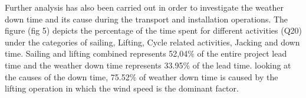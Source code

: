 Further analysis has also been carried out in order to investigate the weather down time and its cause during the transport and installation operations. The figure (fig 5) depicts the percentage of the time spent for different activities (Q20) under the categories  of  sailing, Lifting, Cycle related activities, Jacking and down time. Sailing and lifting combined represents 52,04\% of the entire project lead time and the weather down time represents 33.95\% of the lead time. looking at the causes of the down time, 75.52\% of weather down time is caused by the lifting operation in which the wind speed is the dominant factor.